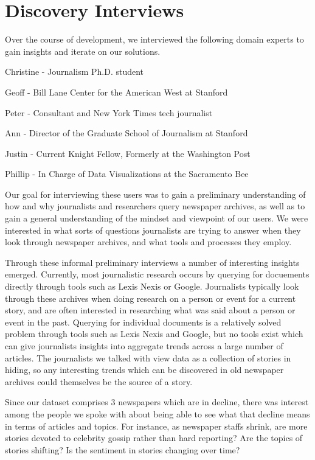 \section{Discovery Interviews}
Over the course of development, we interviewed the following domain experts to gain insights and iterate on our solutions.
\begin{itemize*}
\item Christine - Journalism Ph.D. student
\item Geoff - Bill Lane Center for the American West at Stanford
\item Peter - Consultant and New York Times tech journalist
\item Ann - Director of the Graduate School of Journalism at Stanford
\item Justin - Current Knight Fellow, Formerly at the Washington Post
\item Phillip - In Charge of Data Visualizations at the Sacramento Bee
\end{itemize*}

Our goal for interviewing these users was to gain a preliminary understanding of how and why journalists and researchers query newspaper archives, as well as to gain a general understanding of the mindset and viewpoint of our users. 
We were interested in what sorts of questions journalists are trying to answer when they look through newspaper archives, and what tools and processes they employ.

Through these informal preliminary interviews a number of interesting insights emerged. Currently, most journalistic research occurs by querying for docuements directly through tools such as Lexis Nexis or Google. 
Journalists typically look through these archives when doing research on a person or event for a current story, and are often interested in researching what was said about a person or event in the past.
Querying for individual documents is a relatively solved problem through tools such as Lexis Nexis and Google, but no tools exist which can give journalists insights into aggregate trends across a large number of articles. 
The journalists we talked with view data as a collection of stories in hiding, so any interesting trends which can be discovered in old newspaper archives could themselves be the source of a story.

Since our dataset comprises 3 newspapers which are in decline, there was interest among the people we spoke with about being able to see what that decline means in terms of articles and topics. For instance, as newspaper staffs shrink, are more stories devoted to celebrity gossip rather than hard reporting? Are the topics of stories shifting? Is the sentiment in stories changing over time?

